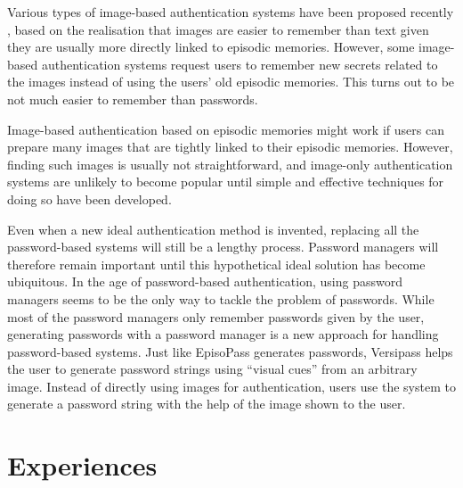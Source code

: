 \documentclass[runningheads,a4paper]{llncs}
\begin{document}
Various types of image-based authentication systems have been proposed recently
\cite{Biddle:2012:GPL:2333112.2333114,GraphicalPasswords},
based on the realisation that images are easier to remember than text
given they are usually more directly linked to episodic memories.
However, some image-based authentication systems request
users to remember new secrets related to the images instead of
using the users' old episodic memories.
This turns out to be not much easier to remember than passwords.
%

Image-based authentication based on episodic memories might work
if users can prepare many images 
that are tightly linked to their episodic memories.
However, finding such images is usually not straightforward, and
image-only authentication systems are unlikely to become popular
until simple and effective techniques for doing so have been developed.

Even when a new ideal authentication method is invented,
replacing all the password-based systems will still be a lengthy process. 
Password managers will therefore remain important until this hypothetical
ideal solution has become ubiquitous.
In the age of password-based authentication,
using password managers seems to be the only way to tackle
the problem of passwords.
%
While most of the password managers only remember passwords given by the user,
generating passwords with a password manager is a new approach for
handling password-based systems.
Just like EpisoPass generates passwords,
Versipass \cite{Stobert:2014:PMD:2683467.2683471} %
helps the user to generate password strings
using ``visual cues'' from an arbitrary image.
Instead of directly using images for authentication,
users use the system to generate a password string with the help of
the image shown to the user.

% 
% 
%

\section{Experiences}
\end{document}
